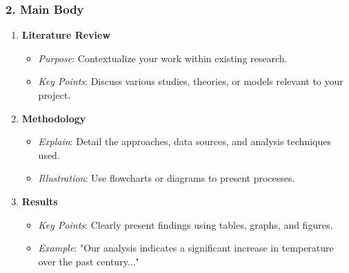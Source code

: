 \documentclass[aspectratio=169]{beamer}
\begin{document}
\begin{frame}[fragile]
    \frametitle{2. Main Body}
    
    \begin{enumerate}
        \item \textbf{Literature Review}
        \begin{itemize}
            \item \textit{Purpose}: Contextualize your work within existing research.
            \item \textit{Key Points}: Discuss various studies, theories, or models relevant to your project.
        \end{itemize}
        
        \item \textbf{Methodology}
        \begin{itemize}
            \item \textit{Explain}: Detail the approaches, data sources, and analysis techniques used.
            \item \textit{Illustration}: Use flowcharts or diagrams to present processes.
        \end{itemize}
        
        \item \textbf{Results}
        \begin{itemize}
            \item \textit{Key Points}: Clearly present findings using tables, graphs, and figures.
            \item \textit{Example}: "Our analysis indicates a significant increase in temperature over the past century..."
        \end{itemize}
    \end{enumerate}
\end{frame}
\end{document}
